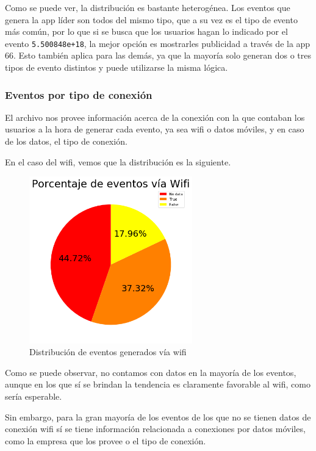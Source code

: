 \documentclass[a4paper, 12pt]{article}
\begin{document}
		Como se puede ver, la distribución es bastante heterogénea. Los eventos que genera la app líder son todos del mismo tipo, que a su vez es el tipo de evento más común, por lo que si se busca que los usuarios hagan lo indicado por el evento \texttt{5.500848e+18}, la mejor opción es mostrarles publicidad a través de la app 66. Esto también aplica para las demás, ya que la mayoría solo generan dos o tres tipos de evento distintos y puede utilizarse la misma lógica.
		
	\subsubsection{Eventos por tipo de conexión}
	
		El archivo nos provee información acerca de la conexión con la que contaban los usuarios a la hora de generar cada evento, ya sea wifi o datos móviles, y en caso de los datos, el tipo de conexión.
	
		En el caso del wifi, vemos que la distribución es la siguiente.
	
		\FloatBarrier
		\begin{figure}[h]
			\centering
			\includegraphics[width=200pt]{images/events/eventosxwifi.png}
			\caption{Distribución de eventos generados vía wifi}
		\end{figure}
		\FloatBarrier
		
		Como se puede observar, no contamos con datos en la mayoría de los eventos, aunque en los que sí se brindan la tendencia es claramente favorable al wifi, como sería esperable.
		
		Sin embargo, para la gran mayoría de los eventos de los que no se tienen datos de conexión wifi sí se tiene información relacionada a conexiones por datos móviles, como la empresa que los provee o el tipo de conexión.
		
\end{document}
